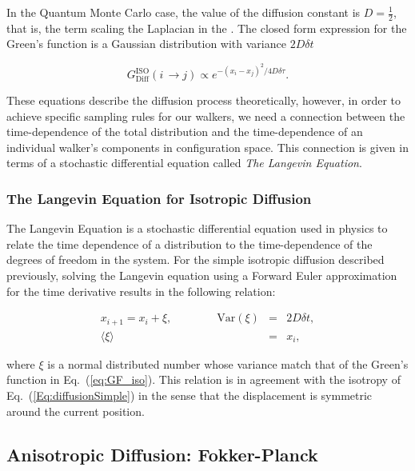 In the Quantum Monte Carlo case, the value of the diffusion constant is $D=\frac{1}{2}$, that is, the term scaling the Laplacian in the \schrodinger. The closed form expression for the Green's function is a Gaussian distribution with variance $2D\delta t$ \cite{abInitioMC}

\begin{equation}
\label{eq:GF_iso}
 G_{\mathrm{Diff}}^{\mathrm{ISO}}(i\,\rightarrow j) \propto e^{-(x_i-x_j)^2/4D\delta\tau}  .
\end{equation}

These equations describe the diffusion process theoretically, however, in order to achieve specific sampling rules for our walkers, we need a connection between the time-dependence of the total distribution and the time-dependence of an individual walker's components in configuration space. This connection is given in terms of a stochastic differential equation called \textit{The Langevin Equation}.

\subsubsection{The Langevin Equation for Isotropic Diffusion}

The Langevin Equation is a stochastic differential equation used in physics to relate the time dependence of a distribution to the time-dependence of the degrees of freedom in the system. For the simple isotropic diffusion described previously, solving the Langevin equation using a Forward Euler approximation for the time derivative results in the following relation:

\begin{eqnarray}
\label{eq:langevinSolSimple}
 x_{i+1} = x_i + \xi, \qquad\qquad \mathrm{Var}(\xi) &=& 2D\delta t, \\
			     \langle\xi\rangle &=& x_i, \nonumber 
\end{eqnarray}

where $\xi$ is a normal distributed number whose variance match that of the Green's function in Eq.~(\ref{eq:GF_iso}). This relation is in agreement with the isotropy of Eq.~(\ref{Eq:diffusionSimple}) in the sense that the displacement is symmetric around the current position.


\subsection{Anisotropic Diffusion: Fokker-Planck}

